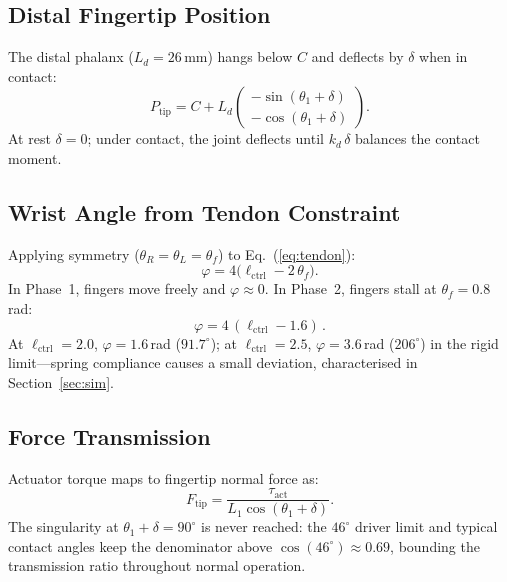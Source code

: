 \documentclass[10pt,twocolumn]{article}
\begin{document}
\subsection{Distal Fingertip Position}
The distal phalanx ($L_d = 26$\,mm) hangs below $C$ and deflects by $\delta$ when in contact:
\begin{equation}
  P_\text{tip} = C + L_d
    \begin{pmatrix}
      -\sin(\theta_1 + \delta) \\
      -\cos(\theta_1 + \delta)
    \end{pmatrix}.
  \label{eq:tip}
\end{equation}
At rest $\delta=0$; under contact, the joint deflects until $k_d\,\delta$ balances the contact moment.

\subsection{Wrist Angle from Tendon Constraint}
Applying symmetry ($\theta_R = \theta_L = \theta_f$) to Eq.~(\ref{eq:tendon}):
\begin{equation}
  \varphi = 4\bigl(\ell_\text{ctrl} - 2\,\theta_f\bigr).
  \label{eq:wrist_from_tendon}
\end{equation}
In Phase~1, fingers move freely and $\varphi \approx 0$. In Phase~2, fingers stall at $\theta_f = 0.8$\,rad:
\begin{equation}
  \varphi = 4\,(\ell_\text{ctrl} - 1.6)\,.
  \label{eq:wrist_phase2}
\end{equation}
At $\ell_\text{ctrl} = 2.0$, $\varphi = 1.6$\,rad ($91.7^\circ$); at $\ell_\text{ctrl} = 2.5$, $\varphi = 3.6$\,rad ($206^\circ$) in the rigid limit---spring compliance causes a small deviation, characterised in Section~\ref{sec:sim}.

\subsection{Force Transmission}
Actuator torque maps to fingertip normal force as:
\begin{equation}
  F_\text{tip} = \frac{\tau_\text{act}}{L_1 \cos(\theta_1 + \delta)}.
  \label{eq:force_tx}
\end{equation}
The singularity at $\theta_1+\delta=90^\circ$ is never reached: the $46^\circ$ driver limit and typical contact angles keep the denominator above $\cos(46^\circ)\approx 0.69$, bounding the transmission ratio throughout normal operation.

\end{document}

